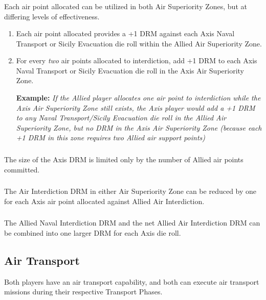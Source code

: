 \subsubsection{}
Each air point allocated can be utilized in both Air Superiority Zones, but at differing levels of effectiveness.

\begin{enumerate}[label=\alph*.]
    \item Each air point allocated provides a +1 DRM against each Axis Naval Transport or Sicily Evacuation die roll within the Allied Air Superiority Zone.
    \item For every \textit{two} air points allocated to interdiction, add +1 DRM to each Axis Naval Transport or Sicily Evacuation die roll in the Axis Air Superiority Zone.
    
    \textbf{Example:} \textit{If the Allied player allocates one air point to interdiction while the Axis Air Superiority Zone still exists, the Axis player would add a +1 DRM to any Naval Transport/Sicily Evacuation die roll in the Allied Air Superiority Zone, but no DRM in the Axis Air Superiority Zone (because each +1 DRM in this zone requires two Allied air support points)}
\end{enumerate}

\subsubsection{}
The size of the Axis DRM is limited only by the number of Allied air points committed.

\subsubsection{}
The Air Interdiction DRM in either Air Superiority Zone can be reduced by one for each Axis air point allocated against Allied Air Interdiction.

\subsubsection{}
The Allied Naval Interdiction DRM and the net Allied Air Interdiction DRM can be combined into one larger DRM for each Axis die roll.

\subsection{Air Transport}
Both players have an air transport capability, and both can execute air transport missions during their respective Transport Phases.

